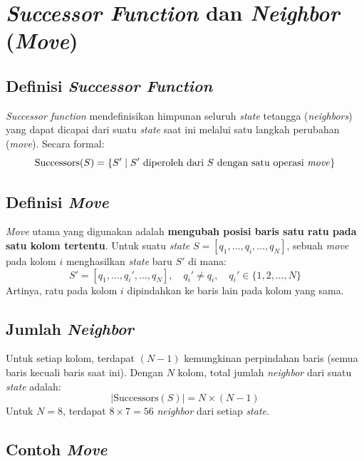 \documentclass[12pt,a4paper]{article}
\begin{document}
\section{\textit{Successor Function} dan \textit{Neighbor} (\textit{Move})}
\label{sec:successor}

\subsection{Definisi \textit{Successor Function}}
\label{subsec:def-successor}

\textit{Successor function} mendefinisikan himpunan seluruh \textit{state} tetangga (\textit{neighbors}) yang dapat dicapai dari suatu \textit{state} saat ini melalui satu langkah perubahan (\textit{move}). Secara formal:
\[
    \text{Successors}(S) = \{ S' \mid S' \text{ diperoleh dari } S \text{ dengan satu operasi \textit{move}} \}
\]

\subsection{Definisi \textit{Move}}
\label{subsec:def-move}

\textit{Move} utama yang digunakan adalah \textbf{mengubah posisi baris satu ratu pada satu kolom tertentu}. Untuk suatu \textit{state} $S = [q_1, \ldots, q_i, \ldots, q_N]$, sebuah \textit{move} pada kolom $i$ menghasilkan \textit{state} baru $S'$ di mana:
\[
    S' = [q_1, \ldots, q_i', \ldots, q_N], \quad q_i' \neq q_i, \quad q_i' \in \{1, 2, \ldots, N\}
\]
Artinya, ratu pada kolom $i$ dipindahkan ke baris lain pada kolom yang sama.

\subsection{Jumlah \textit{Neighbor}}
\label{subsec:jumlah-neighbor}

Untuk setiap kolom, terdapat $(N - 1)$ kemungkinan perpindahan baris (semua baris kecuali baris saat ini). Dengan $N$ kolom, total jumlah \textit{neighbor} dari suatu \textit{state} adalah:
\[
    |\text{Successors}(S)| = N \times (N - 1)
\]
Untuk $N = 8$, terdapat $8 \times 7 = 56$ \textit{neighbor} dari setiap \textit{state}.

\subsection{Contoh \textit{Move}}
\label{subsec:contoh-move}
\end{document}

